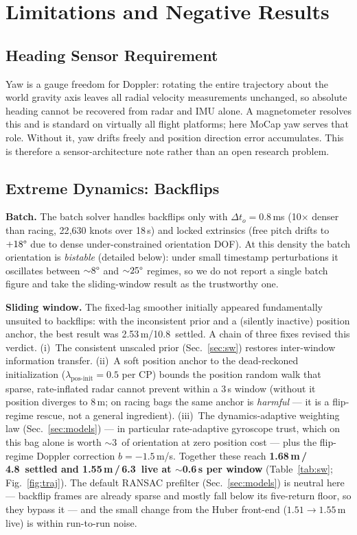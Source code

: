 \documentclass[journal]{IEEEtran}
\begin{document}
\section{Limitations and Negative Results}
\label{sec:limits}

\subsection{Heading Sensor Requirement}
\label{sec:yaw}
Yaw is a gauge freedom for Doppler: rotating the entire trajectory
about the world gravity axis leaves all radial velocity measurements
unchanged, so absolute heading cannot be recovered from radar and IMU
alone.  A magnetometer resolves this and is standard on virtually all
flight platforms; here MoCap yaw serves that role.  Without it, yaw
drifts freely and position direction error accumulates.  This is
therefore a sensor-architecture note rather than an open research
problem.

\subsection{Extreme Dynamics: Backflips}
\label{sec:backflips}

\textbf{Batch.}
The batch solver handles backflips only with $\Delta t_o {=} 0.8$\,ms
(10$\times$ denser than racing, 22{,}630 knots over 18\,s) and
locked extrinsics (free pitch drifts to $+18\degree$ due to dense
under-constrained orientation DOF).  At this density the batch
orientation is \emph{bistable} (detailed below): under small
timestamp perturbations it oscillates between ${\sim}8\degree$ and
${\sim}25\degree$ regimes, so we do not report a single batch figure and
take the sliding-window result as the trustworthy one.

\textbf{Sliding window.}
The fixed-lag smoother initially appeared fundamentally unsuited to
backflips: with the inconsistent prior and a (silently inactive)
position anchor, the best result was 2.53\,m/10.8\degree\ settled.
A chain of three fixes revised this verdict.
(i)~The consistent unscaled prior (Sec.~\ref{sec:sw}) restores
inter-window information transfer.
(ii)~A soft position anchor to the dead-reckoned initialization
($\lambda_{\mathrm{pos\text{-}init}}{=}0.5$ per CP) bounds the
position random walk that sparse, rate-inflated radar cannot prevent
within a 3\,s window (without it position diverges to 8\,m; on racing
bags the same anchor is \emph{harmful} --- it is a flip-regime rescue,
not a general ingredient).
(iii)~The dynamics-adaptive weighting law (Sec.~\ref{sec:models}) ---
in particular rate-adaptive gyroscope trust, which on this bag alone
is worth $\sim$3\degree\ of orientation at zero position cost ---
plus the flip-regime Doppler correction $b{=}{-}1.5$\,m/s.
Together these reach \textbf{1.68\,m\,/\,4.8\degree\ settled and
1.55\,m\,/\,6.3\degree\ live at $\sim$0.6\,s per window}
(Table~\ref{tab:sw}; Fig.~\ref{fig:traj}).  The default RANSAC
prefilter (Sec.~\ref{sec:models})
is neutral here --- backflip frames are already sparse and mostly fall
below its five-return floor, so they bypass it --- and the small change
from the Huber front-end ($1.51\to1.55$\,m live) is within run-to-run
noise.
\end{document}
